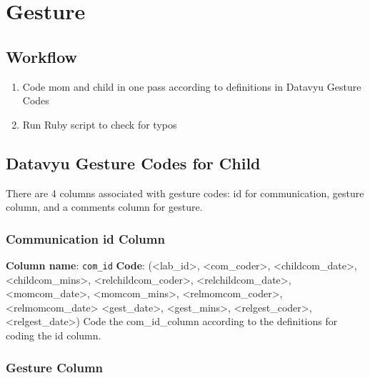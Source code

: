 \documentclass[
]{book}
\providecommand{\tightlist}{%
  \setlength{\itemsep}{0pt}\setlength{\parskip}{0pt}}
\begin{document}
\hypertarget{gesture}{%
\chapter{Gesture}\label{gesture}}

\hypertarget{workflow-1}{%
\section{Workflow}\label{workflow-1}}

\begin{enumerate}
\def\labelenumi{\arabic{enumi}.}
\tightlist
\item
  Code mom and child in one pass according to definitions in Datavyu Gesture Codes
\item
  Run Ruby script to check for typos
\end{enumerate}

\hypertarget{datavyu-gesture-codes-for-child}{%
\section{Datavyu Gesture Codes for Child}\label{datavyu-gesture-codes-for-child}}

There are 4 columns associated with gesture codes: id for communication, gesture column, and a comments column for gesture.

\hypertarget{communication-id-column-1}{%
\subsection{Communication id Column}\label{communication-id-column-1}}

\textbf{Column name}: \texttt{com\_id}
\textbf{Code}: (\textless lab\_id\textgreater, \textless com\_coder\textgreater, \textless childcom\_date\textgreater, \textless childcom\_mins\textgreater, \textless relchildcom\_coder\textgreater, \textless relchildcom\_date\textgreater, \textless momcom\_date\textgreater, \textless momcom\_mins\textgreater, \textless relmomcom\_coder\textgreater, \textless relmomcom\_date\textgreater{} \textless gest\_date\textgreater, \textless gest\_mins\textgreater, \textless relgest\_coder\textgreater, \textless relgest\_date\textgreater)
Code the com\_id\_column according to the definitions for coding the id column.

\hypertarget{gesture-column}{%
\subsection*{Gesture Column}\label{gesture-column}}
\end{document}
